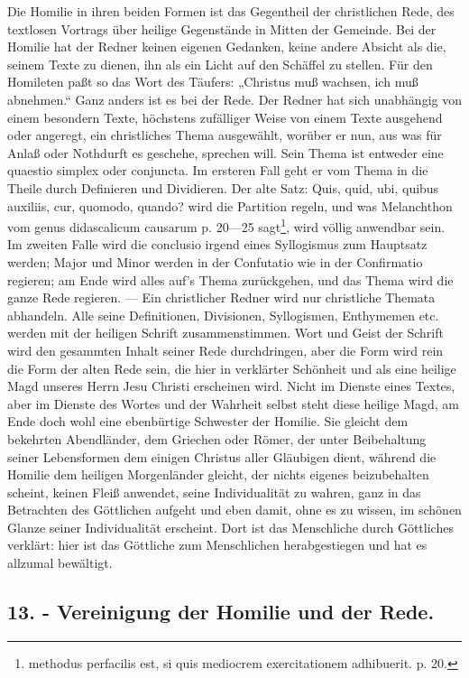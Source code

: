 Die Homilie in ihren beiden Formen ist das Gegentheil der christlichen Rede, des textlosen Vortrags über heilige Gegenstände in Mitten der Gemeinde. Bei der Homilie hat der Redner keinen eigenen Gedanken, keine andere Absicht als die, seinem Texte zu dienen, ihn als ein Licht auf den Schäffel zu stellen. Für den Homileten paßt so das Wort des Täufers: „Christus muß wachsen, ich muß abnehmen.“ Ganz anders ist es bei der Rede. Der Redner hat sich unabhängig von einem besondern Texte, höchstens zufälliger Weise von einem Texte ausgehend oder angeregt, ein christliches Thema ausgewählt, worüber er nun, aus was für Anlaß oder Nothdurft es geschehe, sprechen will. Sein Thema ist entweder eine quaestio simplex oder conjuncta. Im ersteren Fall geht er vom Thema in die Theile durch Definieren und Dividieren. Der alte Satz: Quis, quid, ubi, quibus auxiliis, cur, quomodo, quando? wird die Partition regeln, und was Melanchthon vom genus didascalicum causarum p. 20—25 sagt\footnote{methodus perfacilis est, si quis mediocrem exercitationem adhibuerit. p. 20.}, wird völlig anwendbar sein. Im zweiten Falle wird die conclusio irgend eines Syllogismus zum
Hauptsatz werden; Major und Minor werden in der Confutatio wie in der Confirmatio regieren; am Ende wird alles auf’s Thema zurückgehen, und das Thema wird die ganze Rede regieren. — Ein christlicher Redner wird nur christliche Themata abhandeln. Alle seine Definitionen, Divisionen, Syllogismen, Enthymemen etc. werden mit der heiligen Schrift zusammenstimmen. Wort und Geist der Schrift wird den gesammten Inhalt seiner Rede durchdringen, aber die Form wird rein die Form der alten Rede sein, die hier in verklärter Schönheit und als eine heilige Magd unseres Herrn Jesu Christi erscheinen wird. Nicht im Dienste eines Textes, aber im Dienste des Wortes und der Wahrheit selbst steht diese heilige Magd, am Ende doch wohl eine ebenbürtige Schwester der Homilie. Sie gleicht dem bekehrten Abendländer, dem Griechen oder Römer, der unter Beibehaltung seiner Lebensformen dem einigen Christus aller Gläubigen dient, während die Homilie dem heiligen Morgenländer gleicht, der nichts eigenes beizubehalten scheint, keinen Fleiß anwendet, seine Individualität zu wahren, ganz in das Betrachten des Göttlichen aufgeht und eben damit, ohne es zu wissen, im schönen Glanze seiner Individualität erscheint. Dort ist das Menschliche durch Göttliches verklärt: hier ist das Göttliche zum Menschlichen herabgestiegen und hat es allzumal bewältigt.

\subsection*{13. - Vereinigung der Homilie und der Rede.}


